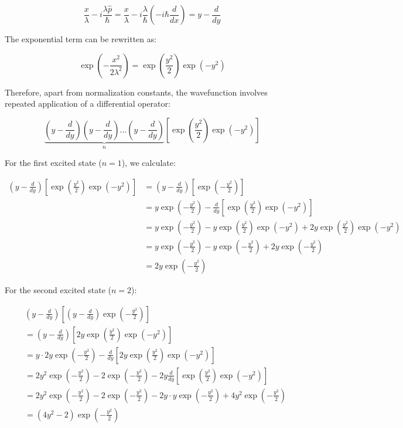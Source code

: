 \begin{equation}
\frac{x}{\lambda} - i\frac{\lambda\hat{p}}{\hbar} = \frac{x}{\lambda} - i\frac{\lambda}{\hbar}\left(-i\hbar\frac{d}{dx}\right) = y - \frac{d}{dy}
\end{equation}

The exponential term can be rewritten as:

\begin{equation}
\exp\left(-\frac{x^2}{2\lambda^2}\right) = \exp\left(\frac{y^2}{2}\right)\exp(-y^2)
\end{equation}

Therefore, apart from normalization constants, the wavefunction involves repeated application of a differential operator:

\begin{equation}
\underbrace{\left(y - \frac{d}{dy}\right)\left(y - \frac{d}{dy}\right)\ldots\left(y - \frac{d}{dy}\right)}_{n}\left[\exp\left(\frac{y^2}{2}\right)\exp(-y^2)\right]
\end{equation}

For the first excited state ($n=1$), we calculate:

\begin{align}
\left(y-\frac{d}{dy}\right)\left[\exp\left(\frac{y^2}{2}\right)\exp(-y^2)\right] &= \left(y-\frac{d}{dy}\right)\left[\exp\left(-\frac{y^2}{2}\right)\right] \\
&= y\exp\left(-\frac{y^2}{2}\right) - \frac{d}{dy}\left[\exp\left(\frac{y^2}{2}\right)\exp(-y^2)\right] \\
&= y\exp\left(-\frac{y^2}{2}\right) - y\exp\left(\frac{y^2}{2}\right)\exp(-y^2) + 2y\exp\left(\frac{y^2}{2}\right)\exp(-y^2) \\
&= y\exp\left(-\frac{y^2}{2}\right) - y\exp\left(-\frac{y^2}{2}\right) + 2y\exp\left(-\frac{y^2}{2}\right) \\
&= 2y\exp\left(-\frac{y^2}{2}\right)
\end{align}

For the second excited state ($n=2$):

\begin{align}
&\left(y-\frac{d}{dy}\right)\left[\left(y-\frac{d}{dy}\right)\exp\left(-\frac{y^2}{2}\right)\right] \\
&= \left(y-\frac{d}{dy}\right)\left[2y\exp\left(\frac{y^2}{2}\right)\exp(-y^2)\right] \\
&= y\cdot 2y\exp\left(-\frac{y^2}{2}\right) - \frac{d}{dy}\left[2y\exp\left(\frac{y^2}{2}\right)\exp(-y^2)\right]  \\
&= 2y^2\exp\left(-\frac{y^2}{2}\right) - 2\exp\left(-\frac{y^2}{2}\right) - 2y\frac{d}{dy}\left[\exp\left(\frac{y^2}{2}\right)\exp(-y^2)\right] \\
&= 2y^2\exp\left(-\frac{y^2}{2}\right) - 2\exp\left(-\frac{y^2}{2}\right) - 2y\cdot y\exp\left(-\frac{y^2}{2}\right) + 4y^2\exp\left(-\frac{y^2}{2}\right) \\
&= (4y^2-2)\exp\left(-\frac{y^2}{2}\right)
\end{align}

